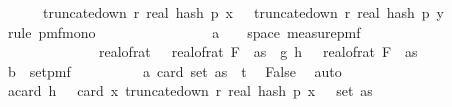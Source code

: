 \begin{isabellebody}
\ \ \ \ \ \ truncate{\isacharunderscore}{\kern0pt}down\ r\ {\isacharparenleft}{\kern0pt}real\ {\isacharparenleft}{\kern0pt}hash\ p\ x\ {\isasymomega}{\isacharparenright}{\kern0pt}{\isacharparenright}{\kern0pt}\ {\isacharequal}{\kern0pt}\ truncate{\isacharunderscore}{\kern0pt}down\ r\ {\isacharparenleft}{\kern0pt}real\ {\isacharparenleft}{\kern0pt}hash\ p\ y\ {\isasymomega}{\isacharparenright}{\kern0pt}{\isacharparenright}{\kern0pt}{\isacharparenright}{\kern0pt}{\isachardoublequoteclose}\ \isanewline
\ \ \ \ \isamarkupfalse%
\ {\isacharparenleft}{\kern0pt}rule\ pmf{\isacharunderscore}{\kern0pt}mono{\isacharunderscore}{\kern0pt}{}{\isacharparenright}{\kern0pt}\isanewline
\ \ \ \ \ \ \isamarkupfalse%
\ {\isasymomega}\isanewline
\ \ \ \ \ \ \isamarkupfalse%
\ a{\isacharcolon}{\kern0pt}{\isachardoublequoteopen}{\isasymomega}\ {\isasymin}\ {\isacharbraceleft}{\kern0pt}{\isasymomega}\ {\isasymin}\ space\ {\isacharparenleft}{\kern0pt}measure{\isacharunderscore}{\kern0pt}pmf\ {\isasymOmega}\isanewline
\ \ \ \ \ \ \ \ \ \ \ \ \ \ real{\isacharunderscore}{\kern0pt}of{\isacharunderscore}{\kern0pt}rat\ {\isasymdelta}\ {\isacharasterisk}{\kern0pt}\ real{\isacharunderscore}{\kern0pt}of{\isacharunderscore}{\kern0pt}rat\ {\isacharparenleft}{\kern0pt}F\ {}\ as{\isacharparenright}{\kern0pt}\ {\isacharless}{\kern0pt}\ {\isasymbar}g{\isacharprime}{\kern0pt}\ {\isacharparenleft}{\kern0pt}h\ {\isasymomega}{\isacharparenright}{\kern0pt}\ {\isacharminus}{\kern0pt}\ real{\isacharunderscore}{\kern0pt}of{\isacharunderscore}{\kern0pt}rat\ {\isacharparenleft}{\kern0pt}F\ {}\ as{\isacharparenright}{\kern0pt}{\isasymbar}{\isacharbraceright}{\kern0pt}{\isachardoublequoteclose}\isanewline
\ \ \ \ \ \ \isamarkupfalse%
\ b{\isacharcolon}{\kern0pt}{\isachardoublequoteopen}{\isasymomega}\ {\isasymin}\ set{\isacharunderscore}{\kern0pt}pmf\ {\isasymOmega}\ \isanewline
\ \ \ \ \ \ \isamarkupfalse%
\ a{\isacharunderscore}{\kern0pt}{}{\isacharcolon}{\kern0pt}\ {\isachardoublequoteopen}card\ {\isacharparenleft}{\kern0pt}set\ as{\isacharparenright}{\kern0pt}\ {\isacharless}{\kern0pt}\ t{\isachardoublequoteclose}\ \isamarkupfalse%
\ False\ \isamarkupfalse%
\ auto\isanewline
\ \ \ \ \ \ \isamarkupfalse%
\ a{\isacharunderscore}{\kern0pt}{}{\isacharcolon}{\kern0pt}{\isachardoublequoteopen}card\ {\isacharparenleft}{\kern0pt}h\ {\isasymomega}{\isacharparenright}{\kern0pt}\ {\isacharequal}{\kern0pt}\ card\ {\isacharparenleft}{\kern0pt}{\isacharparenleft}{\kern0pt}{\isasymlambda}x{\isachardot}{\kern0pt}\ truncate{\isacharunderscore}{\kern0pt}down\ r\ {\isacharparenleft}{\kern0pt}real\ {\isacharparenleft}{\kern0pt}hash\ p\ x\ {\isasymomega}{\isacharparenright}{\kern0pt}{\isacharparenright}{\kern0pt}{\isacharparenright}{\kern0pt}\ {\isacharbackquote}{\kern0pt}\ {\isacharparenleft}{\kern0pt}set\ as{\isacharparenright}{\kern0pt}{\isacharparenright}{\kern0pt}{\isachardoublequoteclose}\isanewline

\end{isabellebody}
